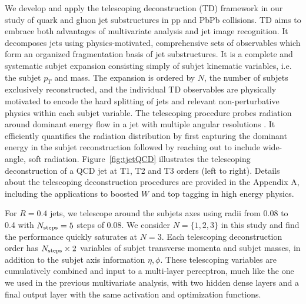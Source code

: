 \documentclass[notoc]{JHEP3}
\begin{document}
We develop and apply the telescoping deconstruction (TD) framework in our study of quark and gluon jet substructures in pp and PbPb collisions. TD aims to embrace both advantages of multivariate analysis and jet image recognition. It decomposes jets using physics-motivated, comprehensive sets of observables which form an organized fragmentation basis of jet substructures. It is a complete and systematic subjet expansion consisting simply of subjet kinematic variables, i.e. the subjet $p_T$ and mass. The expansion is ordered by $N$, the number of subjets exclusively reconstructed, and the individual TD observables are physically motivated to encode the hard splitting of jets and relevant non-perturbative physics within each subjet variable. The telescoping procedure probes radiation around dominant energy flow in a jet with multiple angular resolutions \cite{Chien:2013kca,Chien:2014hla,Chien:2017xrb}. It efficiently quantifies the radiation distribution by first capturing the dominant energy in the subjet reconstruction followed by reaching out to include wide-angle, soft radiation. Figure~\ref{fig:tjetQCD} illustrates the telescoping deconstruction of a QCD jet at T1, T2 and T3 orders (left to right). Details about the telescoping deconstruction procedures are provided in the Appendix A, including the applications to boosted $W$ and top tagging in high energy physics.

For $R=0.4$ jets, we telescope around the subjets axes using radii from 0.08 to 0.4 with $N_{\rm steps} = 5$ steps of 0.08. We consider $N=\{1,2,3\}$ in this study and find the performance quickly saturates at $N=3$. Each telescoping deconstruction order has $N_{\rm steps} \times 2$ variables of subjet transverse momenta and subjet masses, in addition to the subjet axis information $\eta, \phi$. %
These telescoping variables are cumulatively combined and input to a multi-layer perceptron, much like the one we used in the previous multivariate analysis, with two hidden dense layers and a final output layer with the same activation and optimization functions.
\end{document}

